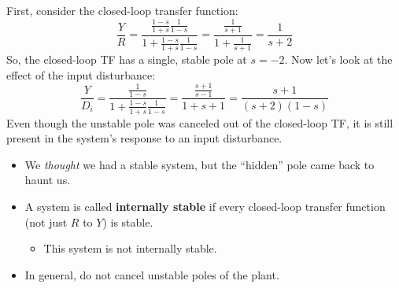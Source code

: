 \documentclass{book}
\begin{document}
First, consider the closed-loop transfer function:
\[ \frac{Y}{R} = \frac{\frac{1-s}{1+s}\frac{1}{1-s}}{1+\frac{1-s}{1+s}\frac{1}{1-s}} = \frac{\frac{1}{s+1}}{1+\frac{1}{s+1}} = \frac{1}{s+2} \]
So, the closed-loop TF has a single, stable pole at $ s=-2 $. Now let's look at the effect of the input disturbance:
\[ \frac{Y}{D_i} = \frac{\frac{1}{1-s}}{1+\frac{1-s}{1+s}\frac{1}{1-s}} = \frac{\frac{s+1}{s-1}}{1+{s+1}} = \frac{s+1}{(s+2)(1-s)} \]
Even though the unstable pole was canceled out of the closed-loop TF, it is still present in the system's response to an input disturbance. 
\begin{itemize}
	\item We \textit{thought} we had a stable system, but the ``hidden'' pole came back to haunt us.
	\item A system is called \textbf{internally stable} if every closed-loop transfer function (not just $ R $ to $ Y $) is stable.
	\begin{itemize}
		\item This system is not internally stable.
	\end{itemize}
	\item In general, do not cancel unstable poles of the plant.
\end{itemize}
\end{document}
